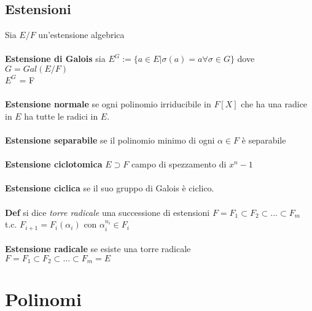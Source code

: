\documentclass[10pt,a4paper]{article}
\begin{document}
\subsection{Estensioni}
Sia $E/F$ un'estensione algebrica\\\\
\textbf{Estensione di Galois} sia $E^G := \{a \in E | \sigma(a) =a \forall \sigma \in G\} $ dove $G=Gal(E/F)$\\$E^G$ = F \\\\
\textbf{Estensione normale} se ogni polinomio irriducibile in $F[X]$ che ha una radice in $E$ ha tutte le radici in $E$.\\\\
\textbf{Estensione separabile} se il polinomio minimo di ogni $\alpha \in F$ è separabile \\\\
\textbf{Estensione ciclotomica} $E \supset F $ campo di spezzamento di $x^n-1$\\\\
\textbf{Estensione ciclica} se il suo gruppo di Galois è ciclico.\\\\
\textbf{Def} si dice \textit{torre radicale} una successione di estensioni $F=F_1 \subset F_2 \subset ... \subset F_m$ t.c. $F_{i+1} = F_i(\alpha_i)$ con $\alpha_i^{n_i} \in F_i$ \\\\
\textbf{Estensione radicale} se esiste una torre radicale \\
$F=F_1 \subset F_2 \subset ... \subset F_m = E$
\newpage
\section{Polinomi}
\end{document}
